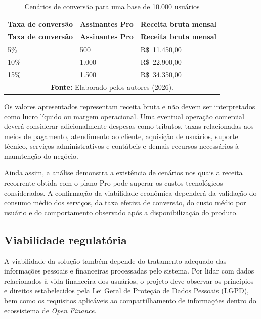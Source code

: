 {\small
\begin{longtable}{|p{4cm}|p{4.5cm}|p{5cm}|}
\caption{Cenários de conversão para uma base de 10.000 usuários}
\label{quad:conversao} \\

\hline
\textbf{Taxa de conversão} &
\textbf{Assinantes Pro} &
\textbf{Receita bruta mensal} \\ \hline
\endfirsthead

\hline
\textbf{Taxa de conversão} &
\textbf{Assinantes Pro} &
\textbf{Receita bruta mensal} \\ \hline
\endhead

5\% &
500 &
R\$~11.450,00 \\ \hline

10\% &
1.000 &
R\$~22.900,00 \\ \hline

15\% &
1.500 &
R\$~34.350,00 \\ \hline

\multicolumn{3}{c}{\fontsize{10pt}{10pt}\selectfont \textbf{Fonte:} Elaborado pelos autores (2026).} \\

\end{longtable}
}

Os valores apresentados representam receita bruta e não devem ser interpretados como lucro líquido ou margem operacional. Uma eventual operação comercial deverá considerar adicionalmente despesas como tributos, taxas relacionadas aos meios de pagamento, atendimento ao cliente, aquisição de usuários, suporte técnico, serviços administrativos e contábeis e demais recursos necessários à manutenção do negócio.

Ainda assim, a análise demonstra a existência de cenários nos quais a receita recorrente obtida com o plano Pro pode superar os custos tecnológicos considerados. A confirmação da viabilidade econômica dependerá da validação do consumo médio dos serviços, da taxa efetiva de conversão, do custo médio por usuário e do comportamento observado após a disponibilização do produto.


\subsection{Viabilidade regulatória}

A viabilidade da solução também depende do tratamento adequado das informações pessoais e financeiras processadas pelo sistema. Por lidar com dados relacionados à vida financeira dos usuários, o projeto deve observar os princípios e direitos estabelecidos pela Lei Geral de Proteção de Dados Pessoais (LGPD), bem como os requisitos aplicáveis ao compartilhamento de informações dentro do ecossistema de \textit{Open Finance}.

